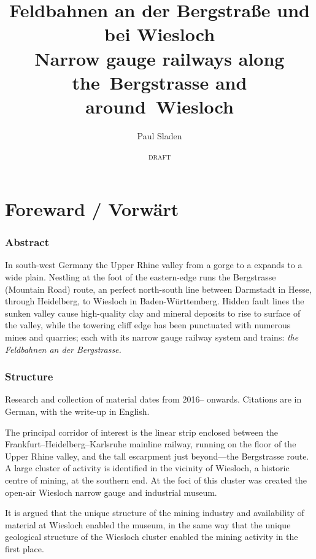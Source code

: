\documentclass[a4paper]{report}
\begin{document}
\title{Feldbahnen an der Bergstraße und bei Wiesloch\\Narrow gauge railways along the~Bergstrasse and around~Wiesloch}
\author{Paul Sladen}
\date{\textsc{draft}}

\maketitle
\tableofcontents{}

\part{Foreward / Vorwärt}
\section*{Abstract}

In south-west Germany the Upper Rhine valley from a gorge to a expands
to a wide plain.  Nestling at the foot of the eastern-edge runs the
Bergstrasse (Mountain Road) route, an perfect north-south line between
Darmstadt in Hesse, through Heidelberg, to Wiesloch in
Baden-Württemberg. Hidden fault lines the sunken valley cause
high-quality clay and mineral deposits to rise to surface of the
valley, while the towering cliff edge has been punctuated with
numerous mines and quarries; each with its narrow gauge railway
system and trains: {\it the Feldbahnen an der Bergstrasse.}

\section*{Structure}

Research and collection of material dates from 2016-- onwards.
Citations are in German, with the write-up in English.

The principal corridor of interest is the linear strip enclosed
between the Frankfurt--Heidelberg--Karlsruhe mainline railway, running
on the floor of the Upper Rhine valley, and the tall escarpment just
beyond---the Bergstrasse route.  A large cluster of activity is
identified in the vicinity of Wiesloch, a historic centre of mining,
at the southern end.  At the foci of this cluster was created the
open-air Wiesloch narrow gauge and industrial museum.

It is argued that the unique structure of the mining industry and
availability of material at Wiesloch enabled the museum, in the same
way that the unique geological structure of the Wiesloch cluster
enabled the mining activity in the first place.
\end{document}
